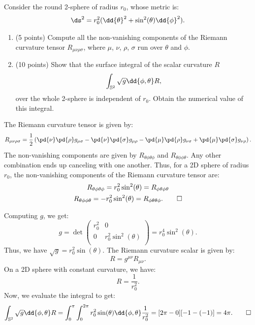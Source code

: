 \begin{solution}[(iii)]
\end{solution}

\begin{solution}[(iv)]
\end{solution}

\begin{solution}[(v)]
\end{solution}

\begin{problem}
  Consider the round 2-sphere of radius $r_0$, whose metric is:
  \[%
    \ds^2 = r_0^2(\dd{\theta}^2 + \sin^2(\theta)\dd{\phi}^2)
  .\]%
  \begin{enumerate}
    \item (5 points) Compute all the non-vanishing components of the Riemann curvature tensor $R_{\mu\nu\rho\sigma}$, where $\mu$, $\nu$, $\rho$, $\sigma$ run over $\theta$ and $\phi$.
    \item (10 points) Show that the surface integral of the scalar curvature $R$
      \[%
        \int_{\S^2} \sqrt{g} \dd{\phi,\theta} R
      ,\]%
      over the whole 2-sphere is independent of $r_0$. Obtain the numerical value of this integral.
  \end{enumerate}
\end{problem}

\begin{solution}[(i)]
  The Riemann curvature tensor is given by:
  \[%
    R_{\mu\nu\rho\sigma} = \frac{1}{2}\left(\pd{\nu}\pd{\rho}g_{\mu\sigma} - \pd{\nu}\pd{\sigma}g_{\mu\rho} - \pd{\mu}\pd{\rho}g_{\nu\sigma} + \pd{\mu}\pd{\sigma}g_{\nu\rho}\right)
  .\]%
  The non-vanishing components are given by $R_{\theta\phi\theta\phi}$ and $R_{\theta\phi\phi\theta}$. Any other combination ends up canceling with one another. Thus, for a 2D sphere of radius $r_0$, the non-vanishing components of the Riemann curvature tensor are:
  \begin{gather*}
    R_{\theta\phi\theta\phi} = r_0^2\sin^2(\theta) = R_{\phi\theta\phi\theta} \\
    R_{\theta\phi\phi\theta} = -r_0^2\sin^2(\theta) = R_{\phi\theta\theta\phi}
  .\qedhere\end{gather*}
\end{solution}

\begin{solution}[(ii)]
  Computing $g$, we get:
  \[%
    g = \det\begin{pmatrix}
      r_0^2 & 0 \\
      0 & r_0^2\sin^2(\theta) \\
    \end{pmatrix} = r_0^4\sin^2(\theta)
  .\]%
  Thus, we have $\sqrt{g} = r_0^2\sin(\theta)$.
  The Riemann curvature scalar is given by:
  \[%
    R = g^{\mu\nu}R_{\mu\nu}
  .\]%
  On a 2D sphere with constant curvature, we have:
  \[%
     R = \frac{1}{r_0^2}
  .\]%
  Now, we evaluate the integral to get:
  \[%
    \int_{\S^2} \sqrt{g} \dd{\phi,\theta} R = \int_0^\pi \int_0^{2\pi} r_0^2\sin(\theta) \dd{\phi,\theta} \frac{1}{r_0^2} = [2\pi - 0][-1 - (-1)] = 4\pi
  .\qedhere\]%
\end{solution}

